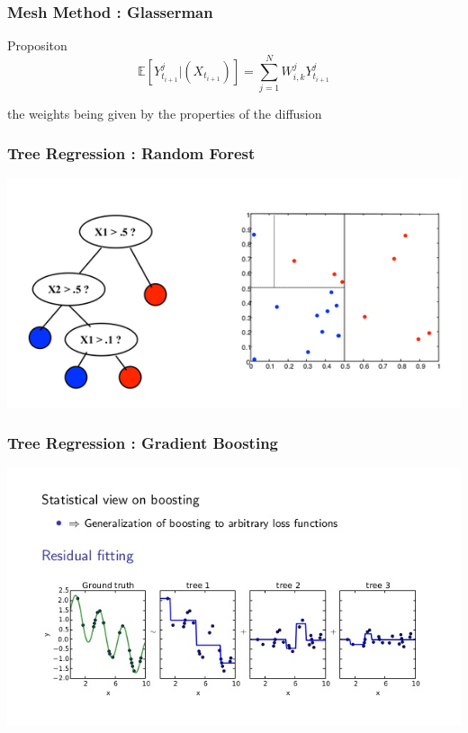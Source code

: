 \documentclass[10pt]{beamer}
\begin{document}
  
   \begin{frame}
   	\frametitle{Mesh Method : Glasserman}
   	
   	\begin{block}{Propositon}
   		\[\mathbb{E}[Y_{t_{i + 1}}^j | (X_{t_{i + 1}})] = \sum_{j=1}^{N} W_{i, k}^jY_{t_{i + 1}}^j\]
   		
   		the weights being given by the properties of the diffusion 
   		
   	\end{block}
   	
   \end{frame}
    \begin{frame}
    	\frametitle{Tree Regression : Random Forest}
    	\centering
    	\includegraphics[scale = 0.6]{rf.png} 
    \end{frame}

	 \begin{frame}
	 	\frametitle{Tree Regression : Gradient Boosting}
	 	\centering
	 	\includegraphics[scale = 0.6]{grad_boost.png} 
	 \end{frame}
	 
\end{document}
